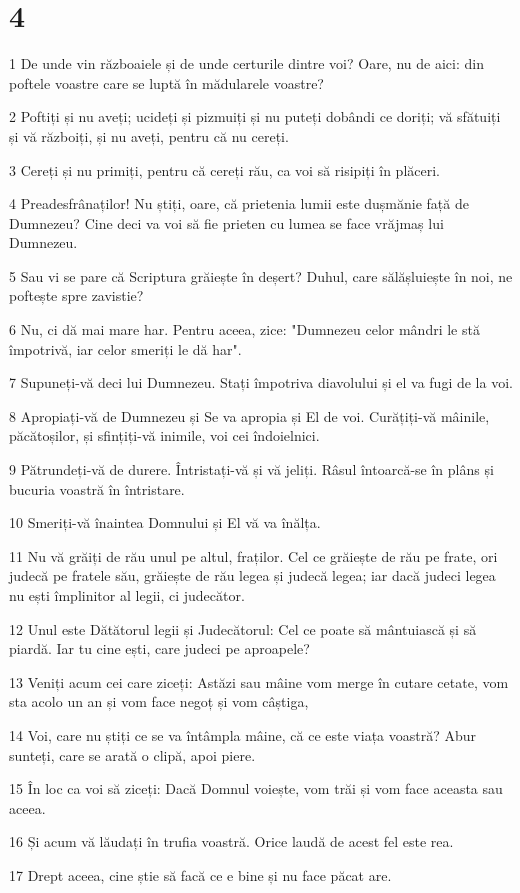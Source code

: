 \chapter{4}

\par 1 De unde vin războaiele și de unde certurile dintre voi? Oare, nu de aici: din poftele voastre care se luptă în mădularele voastre?
\par 2 Poftiți și nu aveți; ucideți și pizmuiți și nu puteți dobândi ce doriți; vă sfătuiți și vă războiți, și nu aveți, pentru că nu cereți.
\par 3 Cereți și nu primiți, pentru că cereți rău, ca voi să risipiți în plăceri.
\par 4 Preadesfrânaților! Nu știți, oare, că prietenia lumii este dușmănie față de Dumnezeu? Cine deci va voi să fie prieten cu lumea se face vrăjmaș lui Dumnezeu.
\par 5 Sau vi se pare că Scriptura grăiește în deșert? Duhul, care sălășluiește în noi, ne poftește spre zavistie?
\par 6 Nu, ci dă mai mare har. Pentru aceea, zice: "Dumnezeu celor mândri le stă împotrivă, iar celor smeriți le dă har".
\par 7 Supuneți-vă deci lui Dumnezeu. Stați împotriva diavolului și el va fugi de la voi.
\par 8 Apropiați-vă de Dumnezeu și Se va apropia și El de voi. Curățiți-vă mâinile, păcătoșilor, și sfințiți-vă inimile, voi cei îndoielnici.
\par 9 Pătrundeți-vă de durere. Întristați-vă și vă jeliți. Râsul întoarcă-se în plâns și bucuria voastră în întristare.
\par 10 Smeriți-vă înaintea Domnului și El vă va înălța.
\par 11 Nu vă grăiți de rău unul pe altul, fraților. Cel ce grăiește de rău pe frate, ori judecă pe fratele său, grăiește de rău legea și judecă legea; iar dacă judeci legea nu ești împlinitor al legii, ci judecător.
\par 12 Unul este Dătătorul legii și Judecătorul: Cel ce poate să mântuiască și să piardă. Iar tu cine ești, care judeci pe aproapele?
\par 13 Veniți acum cei care ziceți: Astăzi sau mâine vom merge în cutare cetate, vom sta acolo un an și vom face negoț și vom câștiga,
\par 14 Voi, care nu știți ce se va întâmpla mâine, că ce este viața voastră? Abur sunteți, care se arată o clipă, apoi piere.
\par 15 În loc ca voi să ziceți: Dacă Domnul voiește, vom trăi și vom face aceasta sau aceea.
\par 16 Și acum vă lăudați în trufia voastră. Orice laudă de acest fel este rea.
\par 17 Drept aceea, cine știe să facă ce e bine și nu face păcat are.

